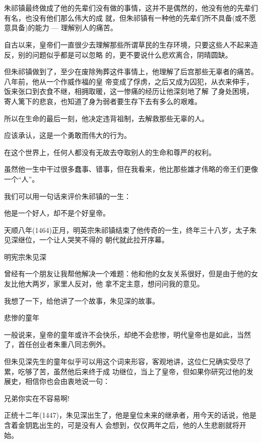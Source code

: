 \documentclass[11pt,a4paper,onecolumn]{article}
\begin{document}
\setcounter{section}{544}

\pagestyle{fancy}

\section[\thesection]{}

朱祁镇最终做成了他的先辈们没有做的事情，这并不是偶然的，他没有他的先辈们有名，也没有他们那么伟大的成
就，但朱祁镇有一种他的先辈们所不具备(或不愿意具备)的能力 --- 理解别人的痛苦。

自古以来，皇帝们一直很少去理解那些所谓草民的生存环境，只要这些人不起来造反，别的问题似乎都是可以忽略
的，更不要说什么悲欢离合，阴晴圆缺。

但朱祁镇做到了，至少在废除殉葬这件事情上，他理解了后宫那些无辜者的痛苦。八年前，他从一个作威作福的皇
帝变成了俘虏，之后又成为囚犯，从衣来伸手，饭来张口到衣食不继，相拥取暖，这一惨痛的经历让他深刻地了解
了身处困境，寄人篱下的悲哀，也知道了身为弱者要生存下去有多么的艰难。

所以在生命的最后一刻，他决定违背祖制，去解救那些无辜的人。

应该承认，这是一个勇敢而伟大的行为。

在这个世界上，任何人都没有无故去夺取别人的生命和尊严的权利。

虽然他一生中干过很多蠢事、错事，但在我看来，他比那些雄才伟略的帝王们更像一个``人''。

我们可以用一句话来评价朱祁镇的一生：

他是一个好人，却不是个好皇帝。

天顺八年(1464)正月，明英宗朱祁镇结束了他传奇的一生，终年三十八岁，太子朱见深继位，一个让人哭笑不得的
朝代就此拉开序幕。

明宪宗朱见深

曾经有一个朋友让我帮他解决一个难题：他和他的女友关系很好，但是由于他的女友比他大两岁，家里人反对，他
拿不定主意，想问问我的意见。

我想了一下，给他讲了一个故事，朱见深的故事。

悲惨的童年

一般说来，皇帝的童年或许不会快乐，却绝不会悲惨，明代皇帝也是如此，当然了，首任创业者朱重八同志例外。

但朱见深先生的童年似乎可以用这个词来形容，客观地讲，这位仁兄确实受尽了累，吃够了苦，虽然他后来终于成
功继位，当上了皇帝，但如果你研究过他的发展史，相信你也会由衷地说一句：

兄弟你实在不容易啊!

正统十二年(1447)，朱见深出生了，他是皇位未来的继承者，用今天的话说，他是含着金钥匙出生的，可是没有人
会想到，仅仅两年之后，他的人生悲剧就将开始。
\end{document}

